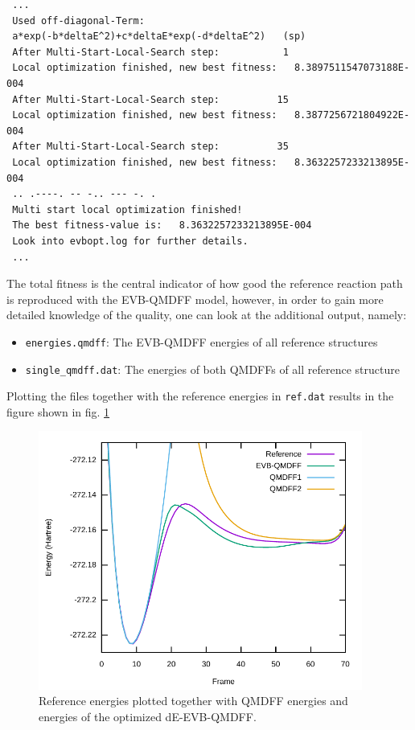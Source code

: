 \documentclass[12pt,a4paper]{scrartcl}
\begin{document}
\begin{verbatim}
 ...
 Used off-diagonal-Term:
 a*exp(-b*deltaE^2)+c*deltaE*exp(-d*deltaE^2)   (sp)
 After Multi-Start-Local-Search step:           1
 Local optimization finished, new best fitness:   8.3897511547073188E-004
 After Multi-Start-Local-Search step:          15
 Local optimization finished, new best fitness:   8.3877256721804922E-004
 After Multi-Start-Local-Search step:          35
 Local optimization finished, new best fitness:   8.3632257233213895E-004
 .. .----. -- -.. --- -. . 
 Multi start local optimization finished!
 The best fitness-value is:   8.3632257233213895E-004
 Look into evbopt.log for further details.
 ...
\end{verbatim}

The total fitness is the central indicator of how good the reference reaction path is 
reproduced with the EVB-QMDFF model, however, in order to gain more detailed knowledge 
of the quality, one can look at the additional output, namely:

\begin{itemize}
 \item \texttt{energies.qmdff}: The EVB-QMDFF energies of all reference structures 
 \item \texttt{single\_qmdff.dat}: The energies of both QMDFFs of all reference structure
\end{itemize}

Plotting the files together with the reference energies in \texttt{ref.dat} results in the 
figure shown in fig. \ref{fig:evbopt_de}

\begin{figure}
          \centering
          \sffamily
          \def\svgwidth{\linewidth}
          \includegraphics[height=8.5cm]{./figures/evbopt_de.pdf}
          \caption{Reference energies plotted together with QMDFF energies and energies of the 
             optimized dE-EVB-QMDFF.}
	  \label{fig:evbopt_de}
\end{figure}
\end{document}
